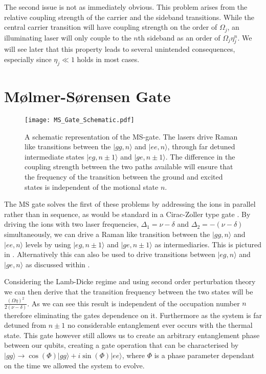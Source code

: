 \documentclass[12pt,twoside]{report}
\begin{document}
The second issue is not as immediately obvious. This problem arises from the relative coupling strength of the carrier and the sideband transitions. While the central carrier transition will have coupling strength on the order of $\Omega_j$, an illuminating laser will only couple to the  $n$th sideband as an order of $\Omega_j\eta_j^n$. We will see later that this property leads to several unintended consequences, especially since $\eta_j\ll 1$ holds in most cases.

\section{M\o lmer-S\o rensen Gate}
\label{Background:MS_gate}

\begin{figure}[t!]
	\centering
	\texttt{[image: MS\_Gate\_Schematic.pdf]}
	\caption[MS-gate schematic representation]{A schematic representation of the MS-gate. The lasers drive Raman like transitions between the $|gg,n\rangle$ and $|ee,n\rangle$, through far detuned intermediate states $|eg,n\pm 1\rangle$ and $|ge,n\pm 1\rangle$. The difference in the coupling strength between the two paths available will ensure that the frequency of the transition between the ground and excited states is independent of the motional state $n$.}
	\label{fig:ms_gate_schematic}
\end{figure}

The MS gate solves the first of these problems by addressing the ions in parallel rather than in sequence, as would be standard in a Cirac-Zoller type gate \cite{Cirac_Zoller}. By driving the ions with two laser frequencies, $\Delta_1=\nu-\delta$ and $\Delta_2=-(\nu-\delta)$ simultaneously, we can drive a Raman like \cite{Foot} transition between the $|gg,n\rangle$ and $|ee,n\rangle$ levels by using $|eg,n\pm 1\rangle$ and $|ge,n\pm 1\rangle$ as intermediaries. This is pictured in . Alternatively this can also be used to drive transitions between $|eg,n\rangle$ and $|ge,n\rangle$ as discussed within \cite{MS_gate}.

Considering the Lamb-Dicke regime and using second order perturbation theory we can then derive that the transition frequency between the two states will be $\frac{\left(\Omega\eta\right)^2}{2\left(\nu-\delta\right)}$\cite{MS_gate}. As we can see this result is independent of the occupation number $n$ therefore eliminating the gates dependence on it. Furthermore as the system is far detuned from $n\pm1$ no considerable entanglement ever occurs with the thermal state. This gate however still allows us to create an arbitrary entanglement phase between our qubits, creating a gate operation that can be characterised by $|gg\rangle\rightarrow\cos\left(\Phi\right)|gg\rangle + i\sin\left(\Phi\right)|ee\rangle$, where $\Phi$ is a phase parameter dependant on the time we allowed the system to evolve.
\end{document}
